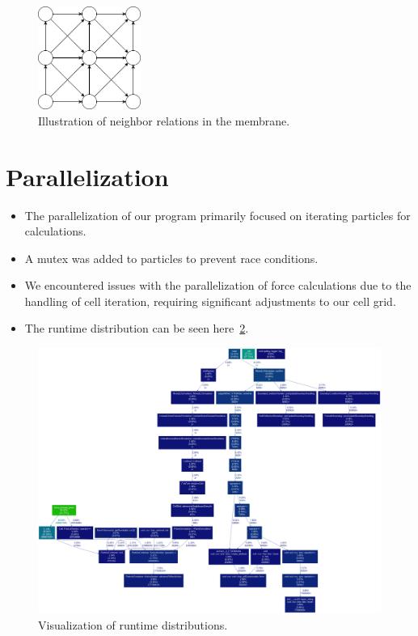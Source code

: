 \documentclass{article}
\begin{document}
\begin{figure}[H]
    \centering
    \includegraphics[width=0.3\textwidth]{../../res/membraneNeighbor.drawio}
    \caption{Illustration of neighbor relations in the membrane.}
    \label{fig:mem}
\end{figure}

\section{Parallelization}
\label{sec:para}

    \begin{itemize}
        \item The parallelization of our program primarily focused on iterating particles for calculations.
        \item A mutex was added to particles to prevent race conditions.
        \item We encountered issues with the parallelization of force calculations due to the handling of cell iteration, requiring significant adjustments to our cell grid.
        \item The runtime distribution can be seen here\ \ref{fig:runtime}.
    \end{itemize}

\begin{figure}[H]
    \centering
    \includegraphics[width=1.3\textwidth]{../../res/runtimeVisualized}
    \caption{Visualization of runtime distributions.}
    \label{fig:runtime}
\end{figure}
\end{document}
